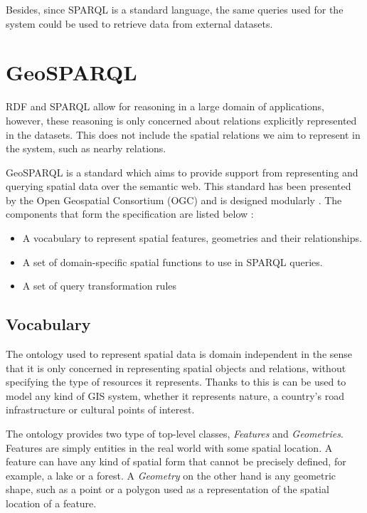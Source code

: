 Besides, since SPARQL is a standard language, the same queries used for the system could be used to retrieve data from external datasets.

\section{GeoSPARQL}\label{sec:geosparql}

RDF and SPARQL allow for reasoning in a large domain of applications, however, these reasoning is only concerned about relations explicitly represented in the datasets. This does not include the spatial relations we aim to represent in the system, such as nearby relations.

GeoSPARQL is a standard which aims to provide support from representing and querying spatial data over the semantic web. This standard has been presented by the Open Geospatial Consortium (OGC) and is designed modularly \cite{geosparqlspec, battle2012enabling}. The components that form the specification are listed below \cite{battle2011linking}:

\begin{itemize}
	\item A vocabulary to represent spatial features, geometries and their relationships.
	\item A set of domain-specific spatial functions to use in SPARQL queries.
	\item A set of query transformation rules
\end{itemize}

\subsection*{Vocabulary}

The ontology used to represent spatial data is domain independent in the sense that it is only concerned in representing spatial objects and relations, without specifying the type of resources it represents. Thanks to this is can be used to model any kind of GIS system, whether it represents nature, a country's road infrastructure or cultural points of interest.

The ontology provides two type of top-level classes, \textit{Features} and \textit{Geometries}. Features are simply entities in the real world with some spatial location. A feature can have any kind of spatial form that cannot be precisely defined, for example, a lake or a forest. A \textit{Geometry} on the other hand is any geometric shape, such as a point or a polygon used as a representation of the spatial location of a feature.

